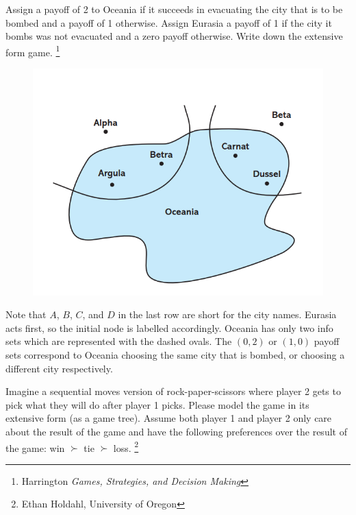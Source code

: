 \documentclass[addpoints ]{exam}
\begin{document}
\begin{questions}
Assign a payoff of 2 to Oceania
if it succeeds in evacuating the city that is to be bombed
and a payoff of 1 otherwise.
Assign Eurasia a payoff of 1 if the city it bombs was not evacuated
and a zero payoff otherwise.
Write down the extensive form game.
\footnote{Harrington \textit{Games, Strategies, and Decision Making}}

\begin{figure}[!h]
  \centering
  \includegraphics[width=.3\linewidth]{figures/figPR2.1.png} 
\end{figure}

\begin{solution}
  \begin{center}
     
  \end{center} 

  Note that $A$, $B$, $C$, and $D$ in the last row are short for the city names.
  Eurasia acts first, so the initial node is labelled accordingly.
  Oceania has only two info sets which are represented with the dashed ovals.
  The $(0,2)$ or $(1,0)$ payoff sets correspond to Oceania choosing the same city that is bombed,
  or choosing a different city respectively.
\end{solution}

\newpage



\question%
Imagine a sequential moves version of rock-paper-scissors
where player 2 gets to pick what they will do after player 1 picks.
Please model the game in its extensive form (as a game tree). 
Assume both player 1 and player 2 only care about the result of the game
and have the following preferences over the result of the game:
win $\succ$ tie $\succ$ loss.
\footnote{Ethan Holdahl, University of Oregon }

\end{questions}
\end{document}
